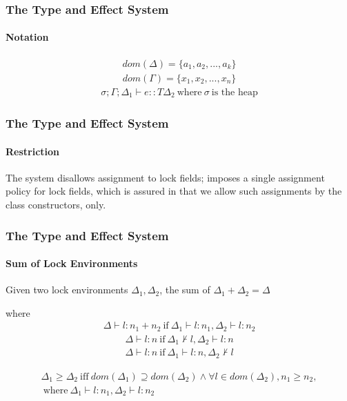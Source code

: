 \begin{frame}
\frametitle{The Type and Effect System}
\framesubtitle{Notation}
\begin{align}
    \tag{Domain of Lock Environment}
    dom(\Delta) = \{a_1, a_2, ..., a_k\}
\end{align}
\begin{align}
    \tag{Domain of Type Environment}
    dom(\Gamma) = \{x_1, x_2, ..., x_n\}
\end{align}
\begin{align}
    \sigma; \Gamma; \Delta_1 \vdash e :: T \Delta_2 ~\text{where} ~\sigma~ \text{is the heap}
\end{align}
\end{frame}



\begin{frame}
\frametitle{The Type and Effect System}
\framesubtitle{Restriction}
The system disallows assignment to lock fields; imposes a single assignment policy for lock fields, which is assured in that we allow such assignments by the class constructors, only.
\end{frame}

\begin{frame}
\frametitle{The Type and Effect System}
\framesubtitle{Sum of Lock Environments}
\begin{definition}
Given two lock environments $\Delta_1, \Delta_2$, the sum of $\Delta_1 + \Delta_2 = \Delta$
\end{definition}
where
\begin{align}
    \Delta \vdash l:n_1+n_2 ~\text{if}~
    \Delta_1 \vdash l:n_1, 
    \Delta_2 \vdash l:n_2
\end{align}
\begin{align}
    \Delta \vdash l:n ~\text{if}~
    \Delta_1 \nvdash l, 
    \Delta_2 \vdash l:n
\end{align}
\begin{align}
    \Delta \vdash l:n ~\text{if}~
    \Delta_1 \vdash l:n, 
    \Delta_2 \nvdash l
\end{align}

\begin{align*}
    \Delta_1 \ge \Delta_2 ~\text{iff}~ dom(\Delta_1) \supseteq dom(\Delta_2) \wedge \forall l \in dom(\Delta_2), n_1 \ge n_2, \\
    ~\text{where}~ \Delta_1 \vdash l:n_1, 
    \Delta_2 \vdash l:n_2
\end{align*}
\end{frame}


